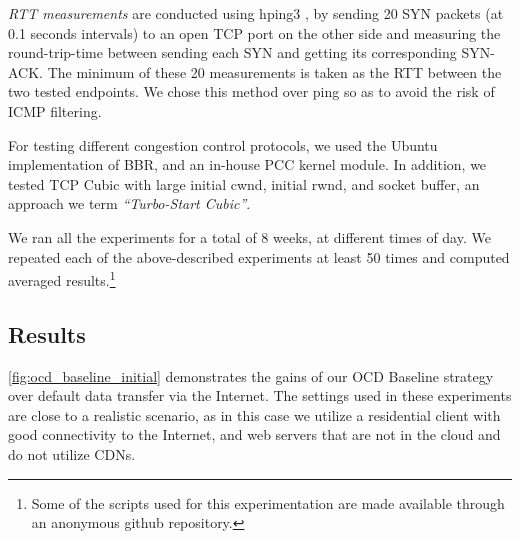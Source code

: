 \documentclass[newfonts=false,format=sigconf,anonymous,10pt,letterpaper]{acmart}
\providecommand{\vs}{vs. }
\begin{document}
\vspace{0.1in} \textit{RTT measurements} are conducted using hping3 \cite{hping3}, by sending 20 SYN packets (at 0.1 seconds intervals) to an open TCP port on the other side and measuring the round-trip-time between sending each SYN and getting its corresponding SYN-ACK. The minimum of these 20 measurements is taken as the RTT between the two tested endpoints. We chose this method over ping so as to avoid the risk of ICMP filtering.

\vspace{0.1in} For testing different congestion control protocols, we used the Ubuntu implementation of BBR, and an in-house PCC kernel module. In addition, we tested TCP Cubic with large initial cwnd, initial rwnd, and socket buffer, an approach we term  \textit{``Turbo-Start Cubic''}. 

\vspace{0.1in} We ran all the experiments for a total of $8$ weeks, 
at different times of day. We repeated each of the above-described experiments at least 50 times and computed averaged results.\footnote{Some of the scripts used for this experimentation are made available through an anonymous github repository.}

\subsection{Results}\label{subsec:ocd-baseline_results}

\vspace{0.1in}\noindent{\bf Baseline \vs Internet e2e.} \autoref{fig:ocd_baseline_initial} demonstrates the gains of our OCD Baseline strategy over default data transfer via the Internet. The settings used in these experiments are close to a realistic scenario, as in this case we utilize a residential client with good connectivity to the Internet, and web servers that are not in the cloud and do not utilize CDNs.
\end{document}
